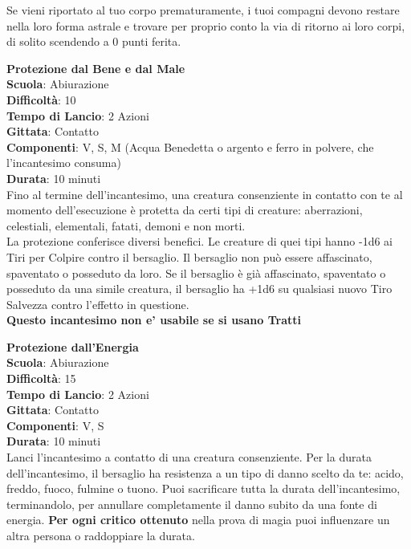 \begin{multicols}{2}
Se vieni riportato al tuo corpo prematuramente, i tuoi compagni devono restare nella loro forma astrale e trovare per proprio conto la via di ritorno ai loro corpi, di solito scendendo a 0 punti ferita.

\medskip\textbf{Protezione dal Bene e dal Male}\\
\textbf{Scuola}: Abiurazione\\
\textbf{Difficoltà}: 10\\
\textbf{Tempo di Lancio}: 2 Azioni\\
\textbf{Gittata}: Contatto\\
\textbf{Componenti}: V, S, M (Acqua Benedetta o argento e ferro in polvere, che l'incantesimo consuma)\\
\textbf{Durata}: 10 minuti\\
Fino al termine dell'incantesimo, una creatura consenziente in contatto con te al momento dell'esecuzione è protetta da certi tipi di creature: aberrazioni, celestiali, elementali, fatati, demoni e non morti.\\
La protezione conferisce diversi benefici. Le creature di quei tipi hanno -1d6 ai Tiri per Colpire contro il bersaglio. Il bersaglio non può essere affascinato, spaventato o posseduto da loro. Se il bersaglio è già affascinato, spaventato o posseduto da una simile creatura, il bersaglio ha +1d6 su qualsiasi nuovo Tiro Salvezza contro l'effetto in questione.\\
\textbf{Questo incantesimo non e' usabile se si usano Tratti}

\medskip\textbf{Protezione dall'Energia}\\
\textbf{Scuola}: Abiurazione\\
\textbf{Difficoltà}: 15\\
\textbf{Tempo di Lancio}: 2 Azioni\\
\textbf{Gittata}: Contatto\\
\textbf{Componenti}: V, S\\
\textbf{Durata}: 10 minuti\\
Lanci l'incantesimo a contatto di una creatura consenziente. Per la durata dell'incantesimo, il bersaglio ha resistenza a un tipo di danno scelto da te: acido, freddo, fuoco, fulmine o tuono. Puoi sacrificare tutta la durata dell'incantesimo, terminandolo, per annullare completamente il danno subito da una fonte di energia.
\textbf{Per ogni critico ottenuto} nella prova di magia puoi influenzare un altra persona o raddoppiare la durata.\


\end{multicols}
